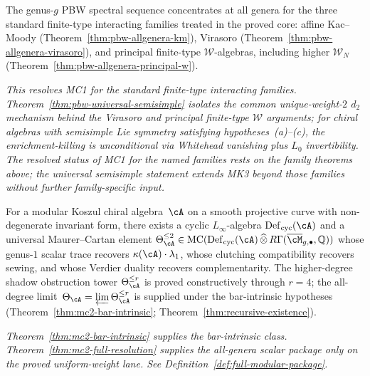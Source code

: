 \begin{theorem}\label{thm:master-pbw}
\ClaimStatusProvedElsewhere{}
The genus-$g$ PBW spectral sequence concentrates at all genera for the
three standard finite-type interacting families treated in the proved
core: affine Kac--Moody
\textup{(}Theorem~\textup{\ref{thm:pbw-allgenera-km}}\textup{)},
Virasoro
\textup{(}Theorem~\textup{\ref{thm:pbw-allgenera-virasoro}}\textup{)},
and principal finite-type $\mathcal{W}$-algebras, including higher
$\mathcal{W}_N$
\textup{(}Theorem~\textup{\ref{thm:pbw-allgenera-principal-w}}\textup{)}.

\emph{This resolves MC1 for the standard finite-type interacting
families. Theorem~\textup{\ref{thm:pbw-universal-semisimple}}
isolates the common unique-weight-$2$ $d_2$ mechanism behind the
Virasoro and principal finite-type $\mathcal{W}$ arguments; for chiral
algebras with semisimple Lie symmetry satisfying
hypotheses~\textup{(a)--(c)}, the enrichment-killing is unconditional
via Whitehead vanishing plus $L_0$ invertibility. The resolved status
of MC1 for the named families rests on the family theorems above;
the universal semisimple statement extends MK3 beyond those families
without further family-specific input.}
\end{theorem}

\begin{theorem}%
\label{thm:master-theta}
\ClaimStatusConditional{}
For a modular Koszul chiral algebra~$\cA$ on a smooth projective
curve with non-degenerate invariant form,
there exists a cyclic
$L_\infty$-algebra $\operatorname{Def}_{\mathrm{cyc}}(\cA)$ and a
universal Maurer--Cartan element
$\Theta_\cA^{\leq 2} \in \operatorname{MC}(
 \operatorname{Def}_{\mathrm{cyc}}(\cA) \,\widehat{\otimes}\,
 R\Gamma(\overline{\cM}_{g,\bullet}, \mathbb{Q}))$
whose genus-$1$ scalar trace recovers
$\kappa(\cA) \cdot \lambda_1$, whose clutching
compatibility recovers sewing, and whose Verdier duality
recovers complementarity. The higher-degree shadow obstruction tower
$\Theta_\cA^{\leq r}$ is proved constructively through $r = 4$;
the all-degree limit~$\Theta_\cA = \varprojlim \Theta_\cA^{\leq r}$
is supplied under the bar-intrinsic hypotheses
(Theorem~\ref{thm:mc2-bar-intrinsic};
Theorem~\ref{thm:recursive-existence}).

\emph{Theorem~\textup{\ref{thm:mc2-bar-intrinsic}} supplies the
bar-intrinsic class. Theorem~\textup{\ref{thm:mc2-full-resolution}}
supplies the all-genera scalar package only on the proved
uniform-weight lane. See
Definition~\textup{\ref{def:full-modular-package}}.}
\end{theorem}


